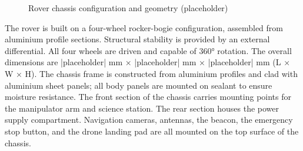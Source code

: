 
\begin{figure}[htbp]
	\centering
	\caption{Rover chassis configuration and geometry (placeholder)}
	\label{fig:rover_chassis_configuration_placeholder}
\end{figure}

The rover is built on a four-wheel rocker-bogie configuration, assembled from aluminium profile sections. Structural stability is provided by an external differential. All four wheels are driven and capable of 360° rotation. The overall dimensions are |placeholder| mm × |placeholder| mm × |placeholder| mm (L × W × H). The chassis frame is constructed from aluminium profiles and clad with aluminium sheet panels; all body panels are mounted on sealant to ensure moisture resistance. The front section of the chassis carries mounting points for the manipulator arm and science station. The rear section houses the power supply compartment. Navigation cameras, antennas, the beacon, the emergency stop button, and the drone landing pad are all mounted on the top surface of the chassis.